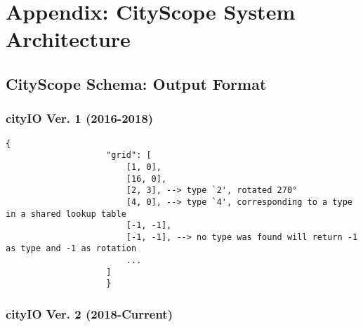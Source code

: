 \section{Appendix: CityScope System Architecture} \label{appendix:system_architecture}
{

    \subsection{CityScope Schema: Output Format}\label{appendix:cityio_output_format}
    {
        \subsubsection{cityIO Ver. 1 (2016-2018)}
        {
            \begin{Verbatim}[baselinestretch=0.75, tabsize=4, fontsize=\small]
                {
                    "grid": [
                        [1, 0],
                        [16, 0],
                        [2, 3], --> type `2', rotated 270°
                        [4, 0], --> type `4', corresponding to a type in a shared lookup table 
                        [-1, -1],
                        [-1, -1], --> no type was found will return -1 as type and -1 as rotation
                        ...
                    ]
                    }
                \end{Verbatim}
        }

        \subsubsection{cityIO Ver. 2 (2018-Current)}
        \begin{Verbatim}[baselinestretch=0.75, tabsize=4, fontsize=\small]


\end{Verbatim}}}
